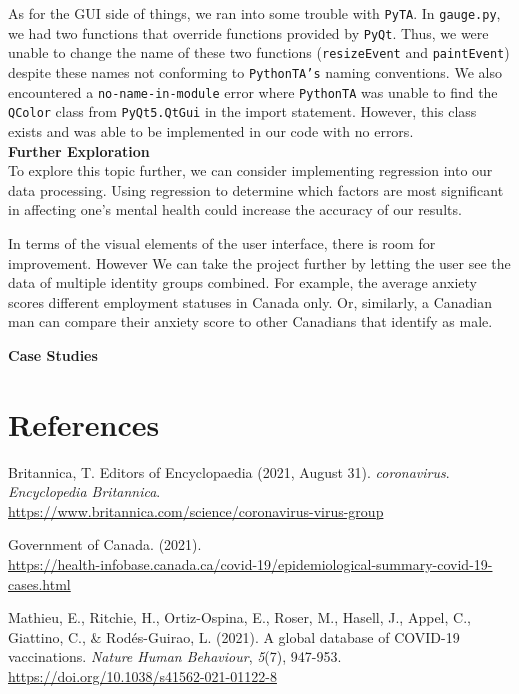 \documentclass[fontsize=11pt]{article}
\begin{document}
	As for the GUI side of things, we ran into some trouble with \texttt{PyTA}. In \texttt{gauge.py}, we had two functions that override functions provided by \texttt{PyQt}. Thus, we were unable to change the name of these two functions (\texttt{resizeEvent} and \texttt{paintEvent}) despite these names not conforming to \texttt{PythonTA’s} naming conventions. We also encountered a \texttt{no-name-in-module} error where \texttt{PythonTA} was unable to find the \texttt{QColor} class from \texttt{PyQt5.QtGui} in the import statement. However, this class exists and was able to be implemented in our code with no errors. \\
	
	\textbf{Further Exploration} \\
	To explore this topic further, we can consider implementing regression into our data processing.  Using regression to determine which factors are most significant in affecting one’s mental health could increase the accuracy of our results.
	
	In terms of the visual elements of the user interface, there is room for improvement. However
	We can take the project further by letting the user see the data of multiple identity groups combined. For example, the average anxiety scores different employment statuses in Canada only. Or, similarly, a Canadian man can compare their anxiety score to other Canadians that identify as male.
	
	\textbf{Case Studies}
	
	
    \section*{References}

    \hangindent=0.7cm
    Britannica, T. Editors of Encyclopaedia (2021, August 31). \textit{coronavirus}. \textit{Encyclopedia Britannica}. \\ \url{https://www.britannica.com/science/coronavirus-virus-group}

    \hangindent=0.7cm \noindent
    Government of Canada. (2021). \\
    \url{https://health-infobase.canada.ca/covid-19/epidemiological-summary-covid-19-cases.html}

    \hangindent=0.7cm \noindent
    Mathieu, E., Ritchie, H., Ortiz-Ospina, E., Roser, M., Hasell, J., Appel, C., Giattino, C., \& Rodés-Guirao, L. (2021). A global database of COVID-19 vaccinations. \textit{Nature Human Behaviour}, \textit{5}(7), 947-953. \\
    \url{https://doi.org/10.1038/s41562-021-01122-8}
\end{document}
